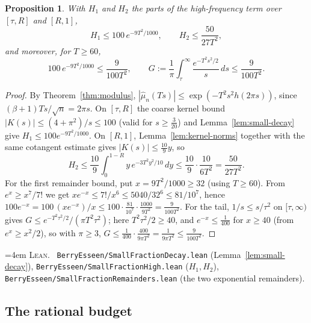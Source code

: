 \documentclass[10pt,a4paper]{article}
\theoremstyle{plain}
\newtheorem{proposition}[theorem]{Proposition}
\theoremstyle{definition}
\newcommand{\file}[1]{\texttt{#1}}
\newenvironment{leanref}%
  {\par\addvspace{3pt}\begingroup\sloppy\emergencystretch=4em
   \noindent\footnotesize\textsc{Lean.}\ \ignorespaces}%
  {\par\endgroup\addvspace{3pt}}
\begin{document}
\begin{proposition}\label{prop:small-high}
With $H_1$ and $H_2$ the parts of the high-frequency term over $[\tau,R]$ and
$[R,1]$,
\[
  H_1 \le 100\,e^{-9T^2/1000},
  \qquad
  H_2 \le \frac{50}{27T^2},
\]
and moreover, for $T\ge60$,
\[
  100\,e^{-9T^2/1000} \le \frac{9}{100T^2},
  \qquad
  G := \frac1\pi\int_\tau^\infty\frac{e^{-T^2s^2/2}}{s}\,ds
  \le \frac{9}{100T^2}.
\]
\end{proposition}

\begin{proof}
By Theorem~\ref{thm:modulus}, $|\hat\mu_n(Ts)|\le\exp(-T^2s^2h(2\pi s))$,
since $(\beta+1)Ts/\sqrt n=2\pi s$. On $[\tau,R]$ the coarse kernel bound
$|K(s)|\le(4+\pi^2)/s\le100$ (valid for $s\ge\tfrac3{20}$) and
Lemma~\ref{lem:small-decay} give $H_1\le100e^{-9T^2/1000}$. On $[R,1]$,
Lemma~\ref{lem:kernel-norms} together with the same cotangent estimate gives
$|K(s)|\le\tfrac{10}{9}y$, so
\[
  H_2 \le \frac{10}{9}\int_0^{1-R}y\,e^{-3T^2y^2/10}\,dy
  \le \frac{10}{9}\cdot\frac{10}{6T^2} = \frac{50}{27T^2}.
\]
For the first remainder bound, put $x=9T^2/1000\ge32$ (using $T\ge60$). From
$e^x\ge x^7/7!$ we get $xe^{-x}\le 7!/x^6\le5040/32^6\le81/10^7$, hence
$100e^{-x}=100\,(xe^{-x})/x\le100\cdot\tfrac{81}{10^7}\cdot\tfrac{1000}{9T^2}
=\tfrac9{100T^2}$. For the tail, $1/s\le s/\tau^2$ on $[\tau,\infty)$ gives
$G\le e^{-T^2\tau^2/2}/(\pi T^2\tau^2)$; here $T^2\tau^2/2\ge40$, and
$e^{-x}\le\tfrac1{400}$ for $x\ge40$ (from $e^x\ge x^2/2$), so with $\pi\ge3$,
$G\le\tfrac1{400}\cdot\tfrac{400}{9\pi T^2}=\tfrac1{9\pi T^2}\le\tfrac9{100T^2}$.
\end{proof}

\begin{leanref}
\file{BerryEsseen/SmallFractionDecay.lean} (Lemma~\ref{lem:small-decay}),
\file{BerryEsseen/SmallFractionHigh.lean} ($H_1,H_2$),
\file{BerryEsseen/SmallFractionRemainders.lean} (the two exponential
remainders).
\end{leanref}

\subsection{The rational budget}
\end{document}
